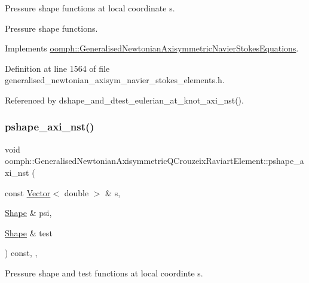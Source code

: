 Pressure shape functions at local coordinate s. 

Pressure shape functions. 

Implements \hyperlink{classoomph_1_1GeneralisedNewtonianAxisymmetricNavierStokesEquations_a45e6df6b18daa524c32659572470cc7b}{oomph\+::\+Generalised\+Newtonian\+Axisymmetric\+Navier\+Stokes\+Equations}.



Definition at line 1564 of file generalised\+\_\+newtonian\+\_\+axisym\+\_\+navier\+\_\+stokes\+\_\+elements.\+h.



Referenced by dshape\+\_\+and\+\_\+dtest\+\_\+eulerian\+\_\+at\+\_\+knot\+\_\+axi\+\_\+nst().

\mbox{\label{classoomph_1_1GeneralisedNewtonianAxisymmetricQCrouzeixRaviartElement_aecfd9564c4afe408d610c7426c47ccf1}} 
\subsubsection{\texorpdfstring{pshape\+\_\+axi\+\_\+nst()}{pshape\_axi\_nst()}\hspace{0.1cm}{\footnotesize\ttfamily [2/2]}}
{\footnotesize\ttfamily void oomph\+::\+Generalised\+Newtonian\+Axisymmetric\+Q\+Crouzeix\+Raviart\+Element\+::pshape\+\_\+axi\+\_\+nst (\begin{DoxyParamCaption}\item[{const \hyperlink{classoomph_1_1Vector}{Vector}$<$ double $>$ \&}]{s,  }\item[{\hyperlink{classoomph_1_1Shape}{Shape} \&}]{psi,  }\item[{\hyperlink{classoomph_1_1Shape}{Shape} \&}]{test }\end{DoxyParamCaption}) const\hspace{0.3cm}{\ttfamily [inline]}, {\ttfamily [protected]}, {\ttfamily [virtual]}}



Pressure shape and test functions at local coordinte s. 

